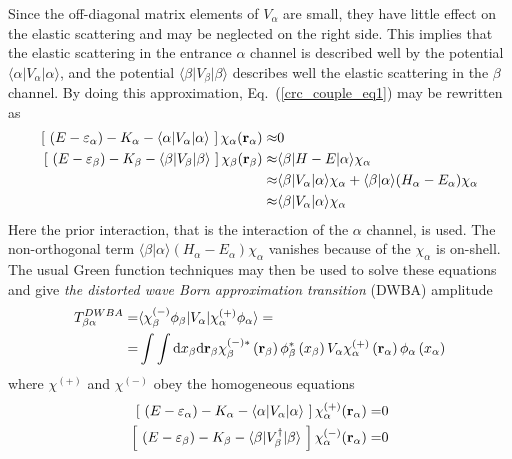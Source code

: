 \documentclass[
12pt, %
oneside, %
english, %
onehalfspacing, %
headsepline, %
]{MastersDoctoralThesis} %
\begin{document}
Since the off-diagonal matrix elements of $V_\alpha$ are small, they have little effect on the elastic scattering and may be neglected on the right side. 
This implies that the elastic scattering in the entrance $\alpha$ channel is described well by the potential $\langle \alpha \vert V_\alpha \vert \alpha \rangle$, and the potential $\langle \beta \vert V_\beta \vert \beta \rangle$ describes well the elastic scattering in the $\beta$ channel.
By doing this approximation, Eq.~(\ref{crc_couple_eq1}) may be rewritten as
\begin{align}
\left[ ~\left(E-\varepsilon_\alpha \right)  -K_\alpha -
\langle \alpha \vert V_\alpha \vert \alpha \rangle ~\right] 
\chi_\alpha ({\bf r}_\alpha) \approx & 0
 \nonumber \\
\left[ ~\left(E-\varepsilon_\beta \right)  -K_\beta -
\langle \beta \vert V_\beta \vert \beta \rangle ~\right] 
\chi_\beta ({\bf r}_\beta) \approx &
\langle \beta \vert H-E \vert \alpha \rangle \chi_\alpha
\nonumber \\
\approx &
\langle \beta \vert V_\alpha \vert  \alpha \rangle \chi_\alpha + \langle \beta \vert \alpha \rangle (H_\alpha - E_\alpha) \chi_\alpha 
\nonumber \\
\approx & \langle \beta \vert V_\alpha \vert  \alpha \rangle \chi_\alpha
\label{crc_couple_eq2}
\end{align}
 Here the prior interaction, that is the interaction of the $\alpha$ channel, is used. The non-orthogonal term $\langle \beta \vert \alpha \rangle (H_\alpha - E_\alpha) \chi_\alpha$ vanishes because of the $\chi_\alpha$ is on-shell. The usual Green function techniques may then be used to solve these equations and give \textit{the  distorted wave Born approximation transition} (DWBA) amplitude 
 \begin{align}
 T_{\beta \alpha}^{DWBA} =& \langle \chi_\beta^{(-)} \phi_\beta  \vert V_\alpha \vert
 \chi_\alpha^{(+)} \phi_\alpha \rangle = \nonumber \\
= & \int \int \text{d}x_\beta \text{d}{\bf r}_\beta \chi_\beta^{(-)*} \left( {\bf r}_\beta \right)\phi_\beta^{*} \left( x_\beta \right) V_\alpha 
 \chi_\alpha^{(+)} \left( {\bf r}_\alpha \right)\phi_\alpha \left( x_\alpha \right)
 \end{align}
 where $\chi^{(+)}$ and $\chi^{(-)}$ obey the homogeneous equations
 \begin{align}
 \left[ ~\left(E-\varepsilon_\alpha \right)  -K_\alpha -
\langle \alpha \vert V_\alpha \vert \alpha \rangle ~\right] 
\chi_\alpha^{(+)} ({\bf r}_\alpha) = & 0 \nonumber \\
 \left[ ~\left(E-\varepsilon_\beta \right)  -K_\beta -
\langle \beta \vert V_\beta^{\dagger} \vert \beta \rangle ~\right] 
\chi_\alpha^{(-)} ({\bf r}_\alpha) = & 0 \nonumber
 \end{align}
\end{document}
